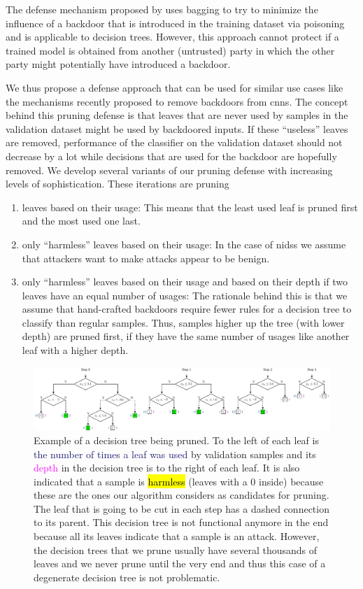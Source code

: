 \documentclass[10pt,sigconf,letterpaper,dvipsnames]{acmart}
\begin{document}
The defense mechanism proposed by \cite{biggio_bagging_2011} uses bagging to try to minimize the influence of a backdoor that is introduced in the training dataset via poisoning and is applicable to decision trees. However, this approach cannot protect if a trained model is obtained from another (untrusted) party in which the other party might potentially have introduced a backdoor. 

We thus propose a defense approach that can be used for similar use cases like the mechanisms recently proposed to remove backdoors from \glspl{cnn}. The concept behind this pruning defense is that leaves that are never used by samples in the validation dataset might be used by backdoored inputs. If these ``useless'' leaves are removed, performance of the classifier on the validation dataset should not decrease by a lot while decisions that are used for the backdoor are hopefully removed. We develop several variants of our pruning defense with increasing levels of sophistication. These iterations are pruning
\begin{enumerate}
\item leaves based on their usage: This means that the least used leaf is pruned first and the most used one last. 
\item only ``harmless'' leaves based on their usage: In the case of \glspl{nids} we assume that attackers want to make attacks appear to be benign. 
\item only ``harmless'' leaves based on their usage and based on their depth if two leaves have an equal number of usages: The rationale behind this is that we assume that hand-crafted backdoors require fewer rules for a decision tree to classify than regular samples. Thus, samples higher up the tree (with lower depth) are pruned first, if they have the same number of usages like another leaf with a higher depth. 
\end{enumerate}
\begin{figure}[h]
\includegraphics[width=\textwidth]{pruning_example.pdf}
\caption{Example of a decision tree being pruned. To the left of each leaf is \textcolor{MidnightBlue}{the number of times a leaf was used} by validation samples and its \textcolor{Fuchsia}{depth} in the decision tree is to the right of each leaf. It is also indicated that a sample is \protect{} \hl{harmless} (leaves with a 0 inside) because these are the ones our algorithm considers as candidates for pruning. The leaf that is going to be cut in each step has a dashed connection to its parent. This decision tree is not functional anymore in the end because all its leaves indicate that a sample is an attack. However, the decision trees that we prune usually have several thousands of leaves and we never prune until the very end and thus this case of a degenerate decision tree is not problematic.}
\label{fig:pruningExample}
\end{figure}
\end{document}
